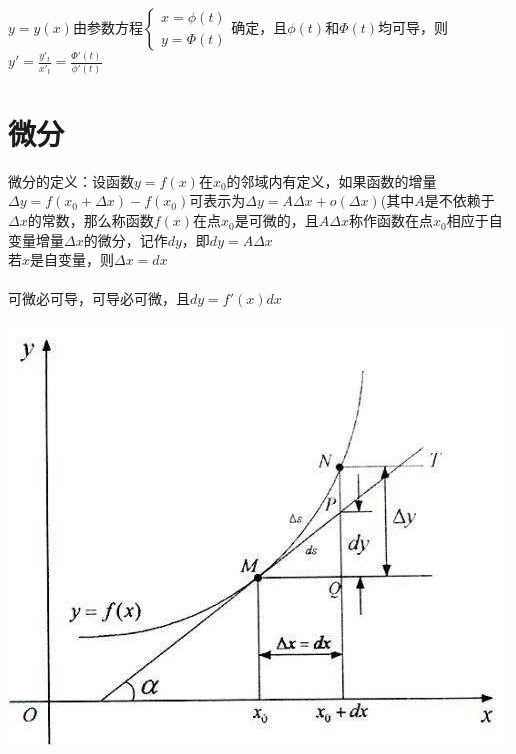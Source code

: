 \documentclass{article}
\begin{document}
\begin{flushleft}
	$y=y(x)$由参数方程$\left\{
	\begin{array}{rcl}
	x=\phi(t)\\
	y=\Phi(t)
	\end{array} \right.$确定，且$\phi(t)$和$\Phi(t)$均可导，则$y'=\frac{y'_t}{x'_t}=\frac{\Phi'(t)}{\phi'(t)}$\\
	
	\section{微分}
	
	微分的定义：设函数$y=f(x)$在$x_0$的邻域内有定义，如果函数的增量$\Delta y = f(x_0 + \Delta x) − f(x_0)$可表示为$ \Delta y = A\Delta x + o(\Delta x)$(其中$A$是不依赖于$\Delta x$的常数，那么称函数$f(x)$在点$x_0$是可微的，且$A\Delta x$称作函数在点$x_0$相应于自变量增量$\Delta x$的微分，记作$dy$，即$dy = A\Delta x$\\
	若$x$是自变量，则$\Delta x=dx$\\
	~\\
	可微必可导，可导必可微，且$dy=f'(x)dx$\\
	~\\
	\includegraphics[scale=1.0]{1.jpg}
	
\end{flushleft}
\end{document}
